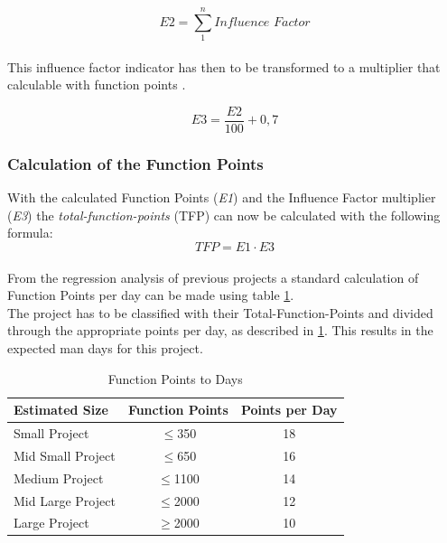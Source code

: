\begin{equation}
\textit{E2} =  \sum \limits_{1}^n   \textit{Influence Factor}  \label{fp:E2}
\end{equation}\\
This influence factor indicator has then to be transformed to a multiplier that calculable with function points \cite{Softwaremanagement}\cite{fpafundamentals}.  

\begin{equation}
	\textit{E3} =\frac{\textit{E2}}{100}  + 0,7 \label{fp:E3}
\end{equation}

\subsubsection{Calculation of the Function Points}

With the calculated Function Points (\textit{E1}) and the Influence Factor multiplier (\textit{E3}) the \textit{total-function-points} (TFP) can now be calculated with the following formula:
\begin{equation}
	\textit{TFP} = \textit{E1} \cdot \textit{E3}  \label{fp:TFP}
\end{equation}\\
From the regression analysis of previous projects a standard calculation of Function Points per day can be made using table \ref{tab:pointsperday}.\\
The project has to be classified with their Total-Function-Points and divided through the appropriate points per day, as described in \ref{tab:pointsperday}. This results in the expected man days for this project.\\
\begin{table}[h] 
	\centering 
	\setlength{\tabcolsep}{4pt}
	\begin{tabular}{|l|c|c|}\hline
		Estimated Size    & Function Points & Points per Day\\ \hline
		Small Project     & $\le$350        & 18 \\ \hline
		Mid Small Project & $\le$650        & 16 \\ \hline
		Medium Project    & $\le$1100 		& 14 \\ \hline
		Mid Large Project & $\le$2000 		& 12\\ \hline
		Large Project     & $\ge$2000 		& 10 \\ \hline
	\end{tabular}
	\caption{Function Points to Days} 
	\label{tab:pointsperday} 
\end{table} 


